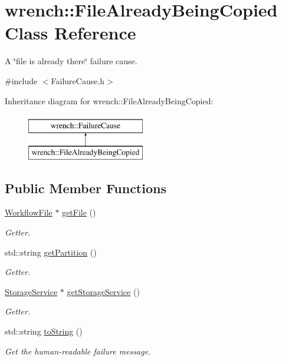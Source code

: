 \hypertarget{classwrench_1_1_file_already_being_copied}{}\section{wrench\+:\+:File\+Already\+Being\+Copied Class Reference}
\label{classwrench_1_1_file_already_being_copied}


A \char`\"{}file is already there\char`\"{} failure cause.  




{\ttfamily \#include $<$Failure\+Cause.\+h$>$}

Inheritance diagram for wrench\+:\+:File\+Already\+Being\+Copied\+:\begin{figure}[H]
\begin{center}
\leavevmode
\includegraphics[height=2.000000cm]{classwrench_1_1_file_already_being_copied}
\end{center}
\end{figure}
\subsection*{Public Member Functions}
\begin{DoxyCompactItemize}
\item 
\hyperlink{classwrench_1_1_workflow_file}{Workflow\+File} $\ast$ \hyperlink{classwrench_1_1_file_already_being_copied_a4bb8bd28c57ad1c9a37985b45f5005f4}{get\+File} ()
\begin{DoxyCompactList}\small\item\em Getter. \end{DoxyCompactList}\item 
std\+::string \hyperlink{classwrench_1_1_file_already_being_copied_af1e681d40a77ced81ce05fa49f1fabf5}{get\+Partition} ()
\begin{DoxyCompactList}\small\item\em Getter. \end{DoxyCompactList}\item 
\hyperlink{classwrench_1_1_storage_service}{Storage\+Service} $\ast$ \hyperlink{classwrench_1_1_file_already_being_copied_afac6f9f7f7dae1f51487c5a6223cad30}{get\+Storage\+Service} ()
\begin{DoxyCompactList}\small\item\em Getter. \end{DoxyCompactList}\item 
std\+::string \hyperlink{classwrench_1_1_file_already_being_copied_a44fa6078be3bd9e0b06cd536b691666c}{to\+String} ()
\begin{DoxyCompactList}\small\item\em Get the human-\/readable failure message. \end{DoxyCompactList}\end{DoxyCompactItemize}
